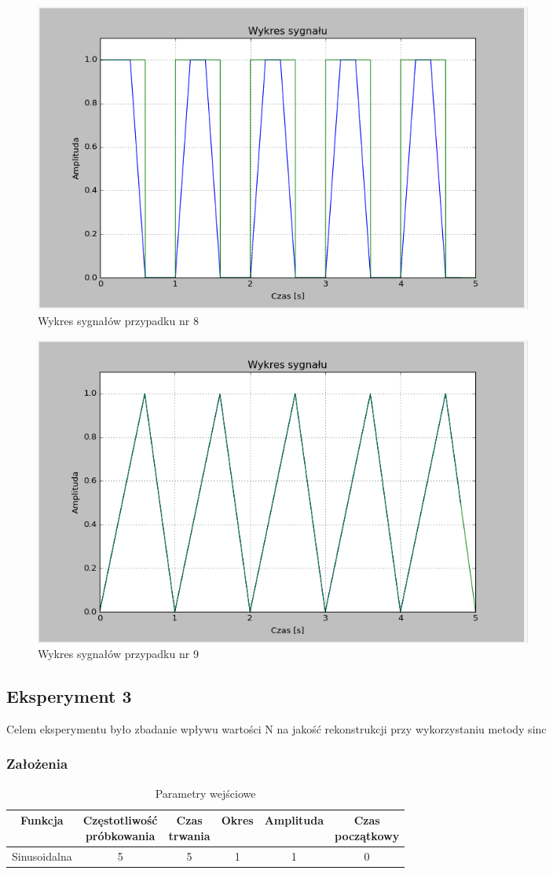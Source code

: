 \documentclass{article}
\begin{document}
    \begin{figure}[h!]
        \centering
        \includegraphics[width=0.8\textwidth]{img/1/foh_rec.png}
        \caption{Wykres sygnałów przypadku nr 8}
    \end{figure}
    \FloatBarrier

    \begin{figure}[h!]
        \centering
        \includegraphics[width=0.8\textwidth]{img/1/foh_tri.png}
        \caption{Wykres sygnałów przypadku nr 9}
    \end{figure}
    \FloatBarrier

    \subsection{Eksperyment 3}
    Celem eksperymentu było zbadanie wpływu wartości N na jakość
    rekonstrukcji przy wykorzystaniu metody sinc

    \subsubsection{Założenia}
    \begin{table}[h!]
        \centering
        \begin{tabular}{|c|c|c|c|c|c|}
            \hline
            Funkcja & \shortstack{Częstotliwość\\ próbkowania} & \shortstack{Czas\\ trwania} & Okres & Amplituda & \shortstack{Czas\\ początkowy}  \\ \hline
            Sinusoidalna & 5 & 5 & 1 & 1 & 0  \\ \hline
        \end{tabular}
        \caption{Parametry wejściowe}
    \end{table}
    
\end{document}
